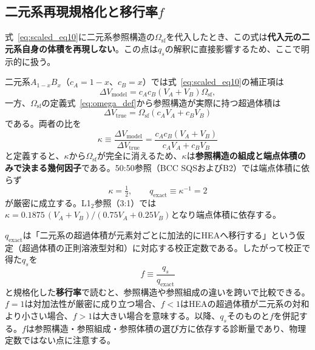 \documentclass[5p,10pt]{elsarticle}
\begin{document}
\subsection{二元系再現規格化と移行率$f$}
\label{sec:transfer}

式~\eqref{eq:scaled_eq10}に二元系参照構造の$\Omega_\text{sf}$を代入したとき、この式は\textbf{代入元の二元系自身の体積を再現しない}。この点は$q_s$の解釈に直接影響するため、ここで明示的に扱う。

二元系$A_{1-x}B_x$（$c_A = 1-x$、$c_B = x$）では式~\eqref{eq:scaled_eq10}の補正項は
\begin{equation}
  \Delta V_\text{model}
  = c_A c_B \left(V_A + V_B\right) \Omega_\text{sf},
  \label{eq:excess_model_binary}
\end{equation}
一方、$\Omega_\text{sf}$の定義式~\eqref{eq:omega_def}から参照構造が実際に持つ超過体積は
\begin{equation}
  \Delta V_\text{true}
  = \Omega_\text{sf}\left(c_A V_A + c_B V_B\right)
  \label{eq:excess_true_binary}
\end{equation}
である。両者の比を
\begin{equation}
  \kappa
  \equiv \frac{\Delta V_\text{model}}{\Delta V_\text{true}}
  = \frac{c_A c_B \left(V_A + V_B\right)}
         {c_A V_A + c_B V_B}
  \label{eq:kappa}
\end{equation}
と定義すると、$\kappa$から$\Omega_\text{sf}$が完全に消えるため、$\kappa$は\textbf{参照構造の組成と端点体積のみで決まる幾何因子}である。50:50参照（BCC SQSおよびB2）では端点体積に依らず
\begin{equation}
  \kappa = \tfrac{1}{2},
  \qquad
  q_\text{exact} \equiv \kappa^{-1} = 2
  \label{eq:qexact_5050}
\end{equation}
が厳密に成立する。L1$_2$参照（3:1）では$\kappa = 0.1875\,(V_A+V_B)/(0.75V_A+0.25V_B)$となり端点体積に依存する。

$q_\text{exact}$は「二元系の超過体積が元素対ごとに加法的にHEAへ移行する」という仮定（超過体積の正則溶液型対和）に対応する校正定数である。したがって校正で得た$q_s$を
\begin{equation}
  f \equiv \frac{q_s}{q_\text{exact}}
  \label{eq:transfer_fraction}
\end{equation}
と規格化した\textbf{移行率}で読むと、参照構造や参照組成の違いを跨いで比較できる。$f = 1$は対加法性が厳密に成り立つ場合、$f < 1$はHEAの超過体積が二元系の対和より小さい場合、$f > 1$は大きい場合を意味する。以降、$q_s$そのものと$f$を併記する。$f$は参照構造・参照組成・参照体積の選び方に依存する診断量であり、物理定数ではない点に注意する。
\end{document}
